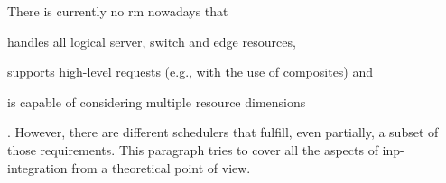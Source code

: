 There is currently no \gls{rm} nowadays that
\begin{mylist}
    \item handles all logical server, switch and edge resources,
    \item supports high-level requests (e.g., with the use of composites) and
    \item is capable of considering multiple resource dimensions
\end{mylist}.
However, there are different schedulers that fulfill, even partially, a subset of those requirements.
This paragraph tries to cover all the aspects of \gls{inp}-integration from a theoretical point of view.